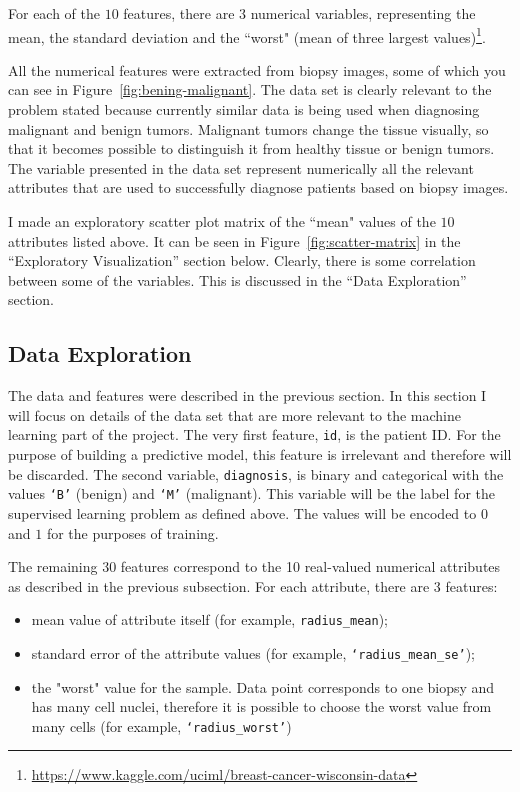 \documentclass[10pt, a4paper]{article}
\begin{document}
For each of the $10$ features, there are $3$ numerical variables, representing the mean, the standard deviation and the ``worst" (mean of three largest values)\footnote{\scriptsize \url{https://www.kaggle.com/uciml/breast-cancer-wisconsin-data}}. 

All the numerical features were extracted from biopsy images, some of which you can see in Figure~\ref{fig:bening-malignant}. The data set is clearly relevant to the problem stated because currently similar data is being used when diagnosing malignant and benign tumors. Malignant tumors change the tissue visually, so that it becomes possible to distinguish it from healthy tissue or benign tumors. The variable presented in the data set represent numerically all the relevant attributes that are used to successfully diagnose patients based on biopsy images.

I made an exploratory scatter plot matrix of the ``mean" values of the $10$ attributes listed above. It can be seen in Figure~\ref{fig:scatter-matrix} in the ``Exploratory Visualization'' section below. Clearly, there is some correlation between some of the variables. This is discussed in the ``Data Exploration'' section.

\subsection{Data Exploration}

The data and features were described in the previous section. In this section I will focus on details of the data set that are more relevant to the machine learning part of the project. The very first feature, \texttt{id}, is the patient ID. For the purpose of building a predictive model, this feature is irrelevant and therefore will be discarded. The second variable, \texttt{diagnosis}, is binary and categorical with the values \texttt{`B'} (benign) and \texttt{`M'} (malignant). This variable will be the label for the supervised learning problem as defined above. The values will be encoded to $0$ and $1$ for the purposes of training.

The remaining 30 features correspond to the 10 real-valued numerical attributes as described in the previous subsection. For each attribute, there are 3 features:

\begin{itemize}
	\item mean value of attribute itself (for example, \texttt{radius\_mean});
	\item standard error of the attribute values (for example, \texttt{`radius\_mean\_se'});
	\item the "worst" value for the sample. Data point corresponds to one biopsy and has many cell nuclei, therefore it is possible to choose the worst value from many cells (for example, \texttt{`radius\_worst'})
\end{itemize}
\end{document}
